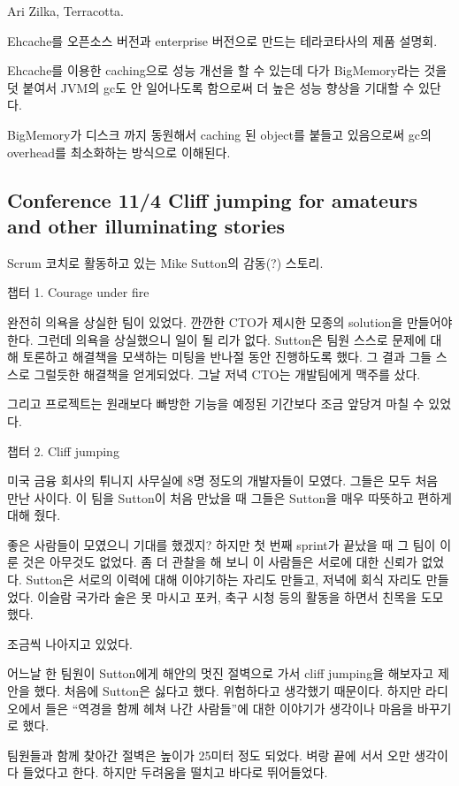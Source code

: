 \documentclass[a4paper]{article}
\begin{document}
Ari Zilka, Terracotta.
 
Ehcache를 오픈소스 버전과 enterprise 버전으로 만드는 테라코타사의 제품 설명회.
 
Ehcache를 이용한 caching으로 성능 개선을 할 수 있는데 다가 BigMemory라는 것을 덧 붙여서 JVM의  gc도 안 일어나도록 함으로써 더 높은 성능 향상을 기대할 수 있단다.
 
BigMemory가 디스크 까지 동원해서 caching 된 object를 붙들고 있음으로써  gc의  overhead를 최소화하는 방식으로 이해된다.
 
\subsection{Conference 11/4 Cliff jumping for amateurs and other illuminating stories}
 
Scrum 코치로 활동하고 있는 Mike Sutton의 감동(?) 스토리.
 
챕터 1. Courage under fire
 
완전히 의욕을 상실한 팀이 있었다. 깐깐한 CTO가 제시한 모종의 solution을
만들어야 한다.  그런데 의욕을 상실했으니 일이 될 리가 없다. Sutton은
팀원 스스로 문제에 대해 토론하고 해결책을 모색하는 미팅을 반나절 동안
진행하도록 했다. 그 결과 그들 스스로 그럴듯한 해결책을 얻게되었다. 그날
저녁 CTO는 개발팀에게 맥주를 샀다.
 
그리고 프로젝트는 원래보다 빠방한 기능을 예정된 기간보다 조금 앞당겨 마칠 수 있었다.
 
챕터 2. Cliff jumping
 
미국 금융 회사의 튀니지 사무실에 8명 정도의 개발자들이 모였다. 그들은
모두 처음 만난 사이다.  이 팀을 Sutton이 처음 만났을 때 그들은 Sutton을
매우 따뜻하고 편하게 대해 줬다.
 
좋은 사람들이 모였으니 기대를 했겠지? 하지만 첫 번째 sprint가 끝났을 때
그 팀이 이룬 것은 아무것도 없었다. 좀 더 관찰을 해 보니 이 사람들은
서로에 대한 신뢰가 없었다. Sutton은 서로의 이력에 대해 이야기하는
자리도 만들고, 저녁에 회식 자리도 만들었다. 이슬람 국가라 술은 못
마시고 포커, 축구 시청 등의 활동을 하면서 친목을 도모했다.
 
조금씩 나아지고 있었다.
 
어느날 한 팀원이 Sutton에게 해안의 멋진 절벽으로 가서 cliff jumping을
해보자고 제안을 했다. 처음에 Sutton은 싫다고 했다. 위험하다고 생각했기
때문이다.  하지만 라디오에서 들은 ``역경을 함께 헤쳐 나간 사람들''에 대한
이야기가 생각이나 마음을 바꾸기로 했다.
 
팀원들과 함께 찾아간 절벽은 높이가 25미터 정도 되었다. 벼랑 끝에 서서
오만 생각이 다 들었다고 한다. 하지만 두려움을 떨치고 바다로
뛰어들었다.
 
\end{document}
